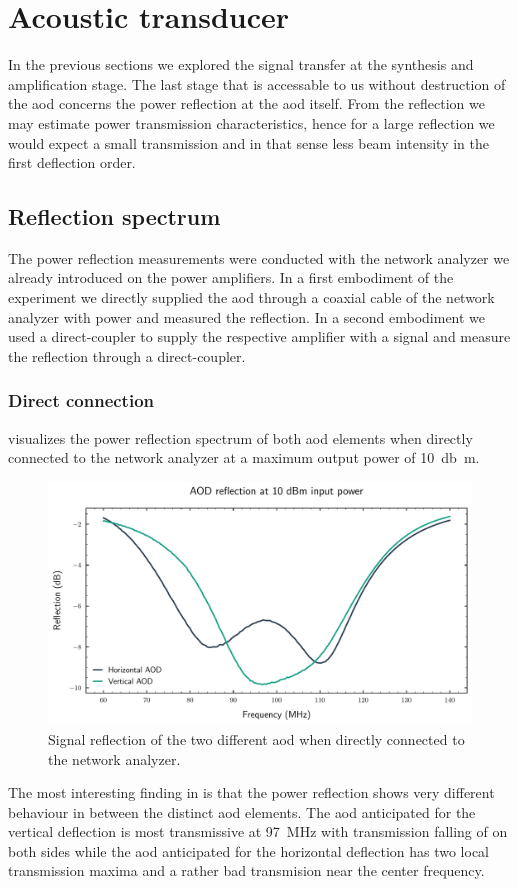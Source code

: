 \section{Acoustic transducer}

In the previous sections we explored the signal transfer at the synthesis
and amplification stage. The last stage that is accessable to us without
destruction of the \gls{aod} concerns the power reflection at the \gls{aod}
itself. From the reflection we may estimate power transmission
characteristics, hence for a large reflection we would expect a small
transmission and in that sense less beam intensity in the first deflection
order.

\subsection{Reflection spectrum}

The power reflection measurements were conducted with the network analyzer
we already introduced on the power amplifiers. In a first embodiment of the
experiment we directly supplied the \gls{aod} through a coaxial cable of the
network analyzer with power and measured the reflection. In a second
embodiment we used a direct-coupler to supply the respective amplifier with a
signal and measure the reflection through a direct-coupler.

\subsubsection{Direct connection}

 visualizes the power reflection spectrum
of both \gls{aod} elements when directly connected to the network analyzer at
a maximum output power of \SI{10}{\decibel\meter}.
\begin{figure}[htb]
  \centering
  \includegraphics[width=.9\textwidth]{../figure/signal/reflection/direct.pdf}
  \caption{Signal reflection of the two different \gls{aod} when directly
    connected to the network analyzer.
  }\label{fig:signal_reflection_direct}
\end{figure}
The most interesting finding in  is that
the power reflection shows very different behaviour in between the distinct
\gls{aod} elements. The \gls{aod} anticipated for the vertical deflection
is most transmissive at \SI{97}{\mega\hertz} with transmission falling of
on both sides while the \gls{aod} anticipated for the horizontal deflection
has two local transmission maxima and a rather bad transmision near the center
frequency.

